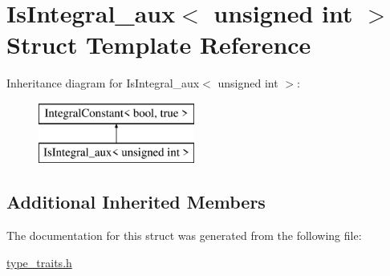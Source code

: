 \hypertarget{struct_is_integral__aux_3_01unsigned_01int_01_4}{}\section{Is\+Integral\+\_\+aux$<$ unsigned int $>$ Struct Template Reference}
\label{struct_is_integral__aux_3_01unsigned_01int_01_4}
Inheritance diagram for Is\+Integral\+\_\+aux$<$ unsigned int $>$\+:\begin{figure}[H]
\begin{center}
\leavevmode
\includegraphics[height=2.000000cm]{struct_is_integral__aux_3_01unsigned_01int_01_4}
\end{center}
\end{figure}
\subsection*{Additional Inherited Members}


The documentation for this struct was generated from the following file\+:\begin{DoxyCompactItemize}
\item 
\hyperlink{type__traits_8h}{type\+\_\+traits.\+h}\end{DoxyCompactItemize}
